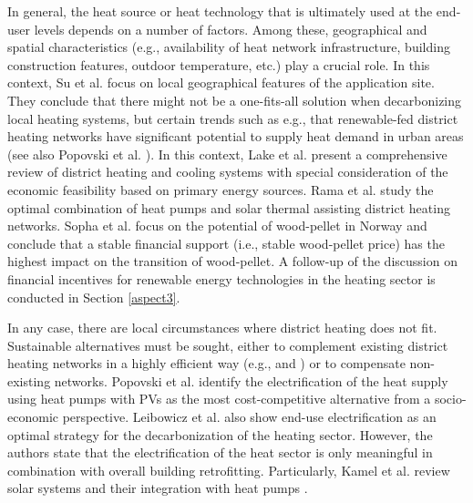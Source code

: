 In general, the heat source or heat technology that is ultimately used at the end-user levels depends on a number of factors. Among these, geographical and spatial characteristics (e.g., availability of heat network infrastructure, building construction features, outdoor temperature, etc.) play a crucial role. In this context, Su et al. \cite{su2018heating} focus on local geographical features of the application site. They conclude that there might not be a one-fits-all solution when decarbonizing local heating systems, but certain trends such as e.g., that renewable-fed district heating networks have significant potential to supply heat demand in urban areas (see also Popovski et al. \cite{popovski2018technical}). In this context, Lake et al. \cite{lake2017review} present a comprehensive review of district heating and cooling systems with special consideration of the economic feasibility based on primary energy sources. Rama et al. \cite{rama2018introduction} study the optimal combination of heat pumps and solar thermal assisting district heating networks. Sopha et al. \cite{sopha2011exploring} focus on the potential of wood-pellet in Norway and conclude that a stable financial support (i.e., stable wood-pellet price) has the highest impact on the transition of wood-pellet. A follow-up of the discussion on financial incentives for renewable energy technologies in the heating sector is conducted in Section \ref{aspect3}.\vspace{0.5cm}

In any case, there are local circumstances where district heating does not fit. Sustainable alternatives must be sought, either to complement existing district heating networks in a highly efficient way (e.g., \cite{rama2018introduction} and \cite{sopha2011exploring}) or to compensate non-existing networks. Popovski et al. \cite{popovski2018technical} identify the electrification of the heat supply using heat pumps with PVs as the most cost-competitive alternative from a socio-economic perspective. Leibowicz et al. \cite{leibowicz2018optimal} also show end-use electrification as an optimal strategy for the decarbonization of the heating sector. However, the authors state that the electrification of the heat sector is only meaningful in combination with overall building retrofitting. Particularly, Kamel et al. review solar systems and their integration with heat pumps \cite{kamel2015solar}.\vspace{0.5cm}

